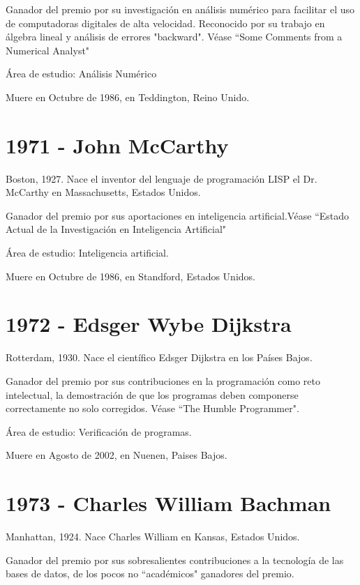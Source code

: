 \documentclass[a4paper, 11pt]{article}
\begin{document}
\noindent Ganador del premio por su investigación en análisis numérico para facilitar el uso de computadoras digitales de alta velocidad. Reconocido por su trabajo en álgebra lineal y análisis de errores "backward". Véase ``Some Comments from a Numerical Analyst"

\noindent Área de estudio: Análisis Numérico

\noindent Muere en Octubre de 1986, en Teddington, Reino Unido.
\newline

\section*{1971 - John McCarthy}
\noindent Boston, 1927. Nace el inventor del lenguaje de programación LISP el Dr. McCarthy en Massachusetts, Estados Unidos.

\noindent Ganador del premio por sus aportaciones en inteligencia artificial.Véase ``Estado Actual de la Investigación en Inteligencia Artificial"

\noindent Área de estudio: Inteligencia artificial.

\noindent Muere en Octubre de 1986, en Standford, Estados Unidos.
\newline

\section*{1972 - Edsger Wybe Dijkstra}
\noindent Rotterdam, 1930. Nace el científico Edsger Dijkstra en los Países Bajos.

\noindent Ganador del premio por sus contribuciones en la programación como reto intelectual, la demostración de que los programas deben componerse correctamente no solo corregidos. Véase ``The Humble Programmer".

\noindent Área de estudio: Verificación de programas.

\noindent Muere en Agosto de 2002, en Nuenen, Paises Bajos.
\newline

\section*{1973 - Charles William Bachman}
\noindent Manhattan, 1924. Nace Charles William en Kansas, Estados Unidos.

\noindent Ganador del premio por sus sobresalientes contribuciones a la tecnología de las bases de datos, de los pocos no ``académicos" ganadores del premio.
\end{document}
